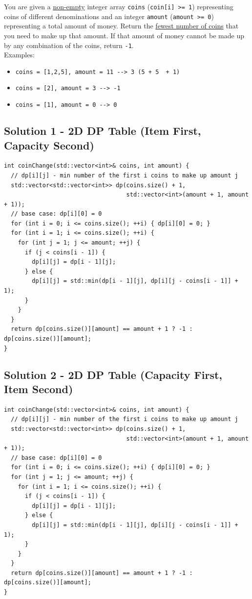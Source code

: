 You are given a \ul{non-empty} integer array {\colorbox{CodeBackground}{\lstinline|coins|}} ({\colorbox{CodeBackground}{\lstinline|coin[i] >= 1|}}) representing coins of different denominations and an integer {\colorbox{CodeBackground}{\lstinline|amount|}} ({\colorbox{CodeBackground}{\lstinline|amount >= 0|}}) representing a total amount of money. Return the \ul{fewest number of coins} that you need to make up that amount. If that amount of money cannot be made up by any combination of the coins, return {\colorbox{CodeBackground}{\lstinline|-1|}}.\\

Examples:
\begin{itemize}
	\item {\colorbox{CodeBackground}{\lstinline|coins = [1,2,5], amount = 11 --> 3 (5 + 5  + 1)|}}
	\item {\colorbox{CodeBackground}{\lstinline|coins = [2], amount = 3 --> -1|}}
	\item {\colorbox{CodeBackground}{\lstinline|coins = [1], amount = 0 --> 0|}}
\end{itemize}

\subsection*{Solution 1 - 2D DP Table (Item First, Capacity Second)}
\begin{lstlisting}
int coinChange(std::vector<int>& coins, int amount) {
  // dp[i][j] - min number of the first i coins to make up amount j
  std::vector<std::vector<int>> dp(coins.size() + 1,
                                   std::vector<int>(amount + 1, amount + 1));
  // base case: dp[i][0] = 0
  for (int i = 0; i <= coins.size(); ++i) { dp[i][0] = 0; }
  for (int i = 1; i <= coins.size(); ++i) {
    for (int j = 1; j <= amount; ++j) {
      if (j < coins[i - 1]) {
        dp[i][j] = dp[i - 1][j];
      } else {
        dp[i][j] = std::min(dp[i - 1][j], dp[i][j - coins[i - 1]] + 1);
      }
    }
  }
  return dp[coins.size()][amount] == amount + 1 ? -1 : dp[coins.size()][amount];
}
\end{lstlisting}

\subsection*{Solution 2 - 2D DP Table (Capacity First, Item Second)}
\begin{lstlisting}
int coinChange(std::vector<int>& coins, int amount) {
  // dp[i][j] - min number of the first i coins to make up amount j
  std::vector<std::vector<int>> dp(coins.size() + 1,
                                   std::vector<int>(amount + 1, amount + 1));
  // base case: dp[i][0] = 0
  for (int i = 0; i <= coins.size(); ++i) { dp[i][0] = 0; }
  for (int j = 1; j <= amount; ++j) {
    for (int i = 1; i <= coins.size(); ++i) {
      if (j < coins[i - 1]) {
        dp[i][j] = dp[i - 1][j];
      } else {
        dp[i][j] = std::min(dp[i - 1][j], dp[i][j - coins[i - 1]] + 1);
      }
    }
  }
  return dp[coins.size()][amount] == amount + 1 ? -1 : dp[coins.size()][amount];
}
\end{lstlisting}

